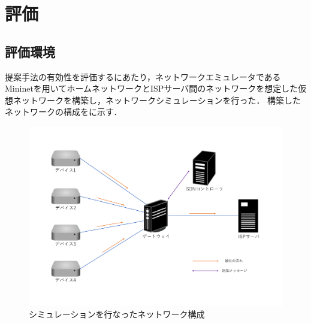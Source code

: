 \documentclass[a4paper,11pt,uplatex]{ujreport}
\begin{document}






\chapter{評価}
\label{chap:評価}

\section{評価環境}
\label{評価環境}

  提案手法の有効性を評価するにあたり，ネットワークエミュレータであるMininetを用いてホームネットワークとISPサーバ間のネットワークを想定した仮想ネットワークを構築し，ネットワークシミュレーションを行った．
  構築したネットワークの構成をに示す．\par

  \begin{figure}[tb]
    \centering
    \includegraphics[width=0.85\linewidth]{img/experiment.pdf}
    \caption{シミュレーションを行なったネットワーク構成}
    \label{fig:experiment}
  \end{figure}
\end{document}

